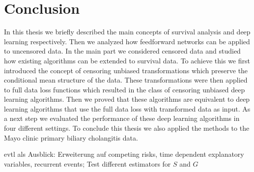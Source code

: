 \documentclass[12pt, a4paper]{scrartcl}
\theoremstyle{definition}
\theoremstyle{plain}
\numberwithin{equation}{section}
\numberwithin{figure}{section}
\numberwithin{table}{section}
\begin{document}
	\newpage
	
	\section{Conclusion}
	In this thesis we briefly described the main concepts of survival analysis and deep learning respectively.
	Then we analyzed how feedforward networks can be applied to uncensored data.
	In the main part we considered censored data and studied how existing algorithms can be extended to survival data.
	To achieve this we first introduced the concept of censoring unbiased transformations which preserve the conditional mean structure of the data. %
	These transformations were then applied to full data loss functions which resulted in the class of censoring unbiased deep learning algorithms.
	Then we proved that these algorithms are equivalent to deep learning algorithms that use the full data loss with transformed data as input.
	As a next step we evaluated the performance of these deep learning algorithms in four different settings.
	To conclude this thesis we also applied the methods to the Mayo clinic primary biliary cholangitis data.
	
	
	
	evtl als Ausblick: Erweiterung auf competing risks, time dependent explanatory variables, recurrent events; Test different estimators for $S$ and $G$
	
	\newpage
	
	\thispagestyle{empty}
	
	
	
	\newpage
	
\end{document}
